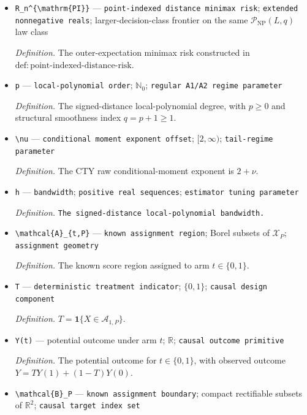 \documentclass{article}
\begin{document}
\begin{itemize}
  \item \texttt{R\_\allowbreak{}n\textasciicircum{}\{\textbackslash{}\allowbreak{}mathrm\{PI\}\allowbreak{}\}\allowbreak{}} --- \texttt{point-\allowbreak{}indexed distance minimax risk}; \texttt{extended nonnegative reals}; larger-decision-class frontier on the same \(\mathcal P_{\mathrm{NP}}(L,q)\) law class
  \par\smallskip\noindent\emph{Definition.} The outer-expectation minimax risk constructed in \(\mathrm{def:point\text{-}indexed\text{-}distance\text{-}risk}\).
  \item \texttt{p} --- \texttt{local-\allowbreak{}polynomial order}; \(\mathbb N_0\); \texttt{regular A1/\allowbreak{}A2 regime parameter}
  \par\smallskip\noindent\emph{Definition.} The signed-distance local-polynomial degree, with \(p\geq0\) and structural smoothness index \(q=p+1\geq1\).
  \item \texttt{\textbackslash{}\allowbreak{}nu} --- \texttt{conditional moment exponent offset}; \([2,\infty)\); \texttt{tail-\allowbreak{}regime parameter}
  \par\smallskip\noindent\emph{Definition.} The CTY raw conditional-moment exponent is \(2+\nu\).
  \item \texttt{h} --- \texttt{bandwidth}; \texttt{positive real sequences}; \texttt{estimator tuning parameter}
  \par\smallskip\noindent\emph{Definition.} \texttt{The signed-\allowbreak{}distance local-\allowbreak{}polynomial bandwidth.}
  \item \texttt{\textbackslash{}\allowbreak{}mathcal\{A\}\allowbreak{}\_\allowbreak{}\{t,\allowbreak{}P\}\allowbreak{}} --- \texttt{known assignment region}; Borel subsets of \(\mathcal X_P\); \texttt{assignment geometry}
  \par\smallskip\noindent\emph{Definition.} The known score region assigned to arm \(t\in\{0,1\}\).
  \item \texttt{T} --- \texttt{deterministic treatment indicator}; \(\{0,1\}\); \texttt{causal design component}
  \par\smallskip\noindent\emph{Definition.} \(T=\mathbf1\{X\in\mathcal A_{1,P}\}\).
  \item \texttt{Y(t)} --- potential outcome under arm \(t\); \(\mathbb R\); \texttt{causal outcome primitive}
  \par\smallskip\noindent\emph{Definition.} The potential outcome for \(t\in\{0,1\}\), with observed outcome \(Y=TY(1)+(1-T)Y(0)\).
  \item \texttt{\textbackslash{}\allowbreak{}mathcal\{B\}\allowbreak{}\_\allowbreak{}P} --- \texttt{known assignment boundary}; compact rectifiable subsets of \(\mathbb R^2\); \texttt{causal target index set}

\end{itemize}
\end{document}
